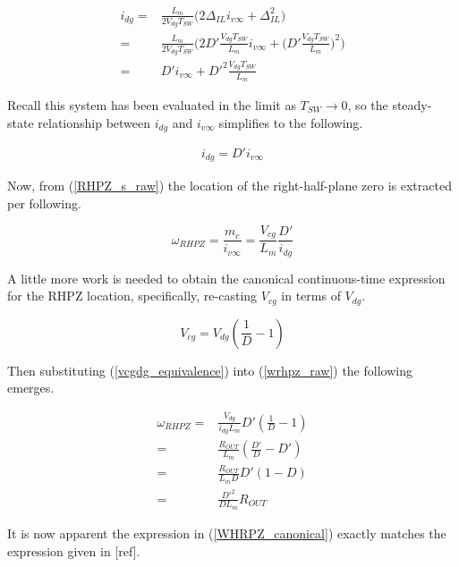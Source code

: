 \documentclass[conference]{IEEEtran}
\begin{document}
\begin{align}
i_{dg} =& \frac{L_m}{2V_{dg}T_{SW}} \bigg(2\Delta_{IL} i_{v\infty} + \Delta_{IL}^2 \bigg) \nonumber \\
=& \frac{L_m}{2V_{dg}T_{SW}} \bigg(2 D'\frac{V_{dg} T_{SW}}{L_m} i_{v\infty} + \bigg(D'\frac{V_{dg} T_{SW}}{L_m}\bigg)^2\bigg) \nonumber \\
=&  D' i_{v\infty} + D'^2\frac{V_{dg} T_{SW}}{L_m}
\end{align}

Recall this system has been evaluated in the limit as $T_{SW} \to 0$, so the steady-state relationship between $i_{dg}$ and $i_{v\infty}$ simplifies to the following.

\begin{align}
i_{dg} = D' i_{v\infty}
\end{align}

Now, from (\ref{RHPZ_s_raw}) the location of the right-half-plane zero is extracted per following.

\begin{equation}
	\omega_{RHPZ} = \frac{m_c}{i_{v\infty}} = \frac{V_{cg}}{L_m} \frac{D'}{i_{dg}}
	\label{wrhpz_raw}
\end{equation}

A little more work is needed to obtain the canonical continuous-time expression for the RHPZ location, specifically, re-casting $V_{cg}$ in terms of $V_{dg}$.

\begin{equation}
V_{cg} = V_{dg} (\frac{1}{D} - 1)
\label{vcgdg_equivalence}
\end{equation}

Then substituting (\ref{vcgdg_equivalence}) into (\ref{wrhpz_raw}) the following emerges.

\begin{align}
	\omega_{RHPZ} =& \frac{V_{dg}}{ i_{dg} L_m } D' (\frac{1}{D} - 1) \nonumber \\
	=& \frac{R_{OUT}}{L_m} (\frac{D'}{D} - D') \nonumber \\
	=&  \frac{R_{OUT}}{L_m D} D'(1-D) \nonumber \\
	=& \frac{D'^2}{D L_m} R_{OUT}
	\label{WHRPZ_canonical}
\end{align}

It is now apparent the expression in (\ref{WHRPZ_canonical}) exactly matches the expression given in [ref].
\end{document}
